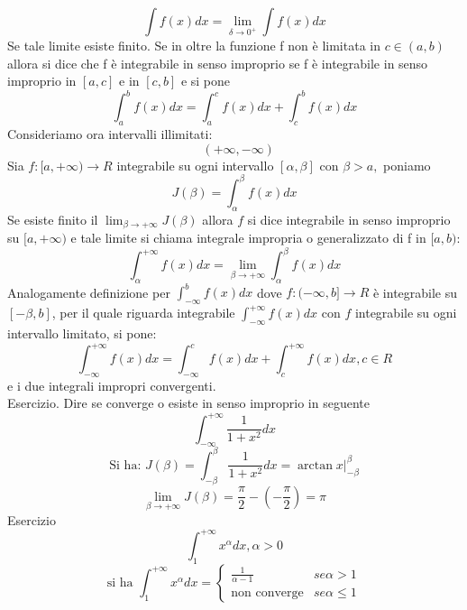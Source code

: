 \begin{equation*}
	\int f(x)dx=\lim_{\delta\to 0^+}\int f(x)dx
\end{equation*}
Se tale limite esiste finito. Se in oltre la funzione f non è limitata in $c\in (a,b)$ allora si dice che f è integrabile in senso improprio se f è integrabile in senso improprio in $[a,c]$ e in $[c,b]$ e si pone
\begin{equation*}
	\int^b_a f(x)dx=\int^c_a f(x)dx+\int^b_cf(x)dx
\end{equation*}
Consideriamo ora intervalli illimitati:
\begin{equation*}
	[a,+\infty) \text{ } (-\infty,b]\text{ }(+\infty,-\infty)
\end{equation*}
Sia $f:[a,+\infty)\to R$ integrabile su ogni intervallo $[\alpha, \beta]$ con $\beta >a,$ poniamo
\begin{equation}
	J(\beta)=\int^\beta_\alpha f(x)dx
\end{equation}
Se esiste finito il $\lim_{\beta\to+\infty}J(\beta)$ allora $f$ si dice integrabile in senso improprio su $[a,+\infty)$ e tale limite si chiama {\color{red}integrale impropria o generalizzato} di f in $[a,b)$:
\begin{equation*}
	\int^{+\infty}_{\alpha}f(x)dx=\lim_{\beta\to+\infty}\int^\beta_\alpha f(x)dx
\end{equation*}
Analogamente definizione per $\int^b_{-\infty}f(x)dx$ dove $f:(-\infty,b]\to R$ è integrabile su $[-\beta,b]$, per il quale riguarda integrabile $\int_{-\infty}^{+\infty}f(x)dx$ con $f$ integrabile su ogni intervallo limitato, si pone:
\begin{equation*}
	\int^{+\infty}_{-\infty}f(x)dx=\int^{c}_{-\infty}f(x)dx+\int^{+\infty}_{c}f(x)dx, c\in R
\end{equation*}
e i due integrali impropri convergenti.\\
Esercizio. Dire se converge o esiste in senso improprio in seguente
\begin{equation*}
	\int^{+\infty}_{-\infty}\frac{1}{1+x^2}dx
\end{equation*}
\begin{equation*}
	\text{Si ha: } J(\beta)=\int^\beta_{-\beta}\frac{1}{1+x^2}dx=\arctan x \bigg|^\beta_{-\beta}
\end{equation*}
\begin{equation*}
	\lim_{\beta\to+\infty}J(\beta)=\frac{\pi}{2}-(-\frac{\pi}{2})=\pi
\end{equation*}
Esercizio
\begin{equation*}
	 \int^{+\infty}_1x^\alpha dx, \alpha>0
\end{equation*}
\begin{equation*}
	\text{si ha }\int^{+\infty}_1x^\alpha dx=\begin{cases}
		\frac{1}{\alpha-1}&se \alpha >1\\
		\text{non converge}&se \alpha\leq 1
	\end{cases}
\end{equation*}
